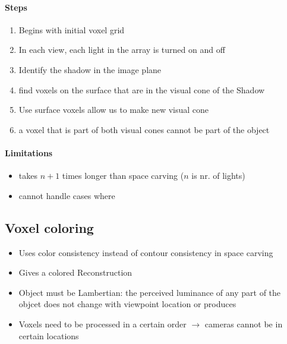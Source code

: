 \documentclass[8pt, a4paper, landscape, includeheadfoot]{extarticle}
\begin{document}
\begin{multicols*}{4}
	\paragraph{Steps}
	\begin{enumerate}[itemsep=0pt, leftmargin=8pt]
		\item Begins with initial voxel grid
		\item In each view, each light in the array is turned on and off
		\item Identify the shadow in the image plane
		\item find voxels on the surface that are in the visual cone of the Shadow
		\item Use surface voxels allow us to make new visual cone
		\item a voxel that is part of both visual cones cannot be part of the object
	\end{enumerate}
	\paragraph{Limitations}
	\begin{itemize}[itemsep=0pt, leftmargin=8pt]
		\item takes $n + 1$ times longer than space carving ($n$ is nr. of lights)
		\item cannot handle cases where
	\end{itemize}

	\subsection{Voxel coloring}
	\begin{itemize}[itemsep=0pt, leftmargin=8pt]
		\item Uses color consistency instead of contour consistency in space carving
		\item Gives a colored Reconstruction
		\item Object must be Lambertian: the perceived luminance of any part of the objcet does not change with viewpoint location or produces
		\item Voxels need to be processed in a certain order $\to$ cameras cannot be in certain locations
	\end{itemize}
\end{multicols*}
\end{document}
